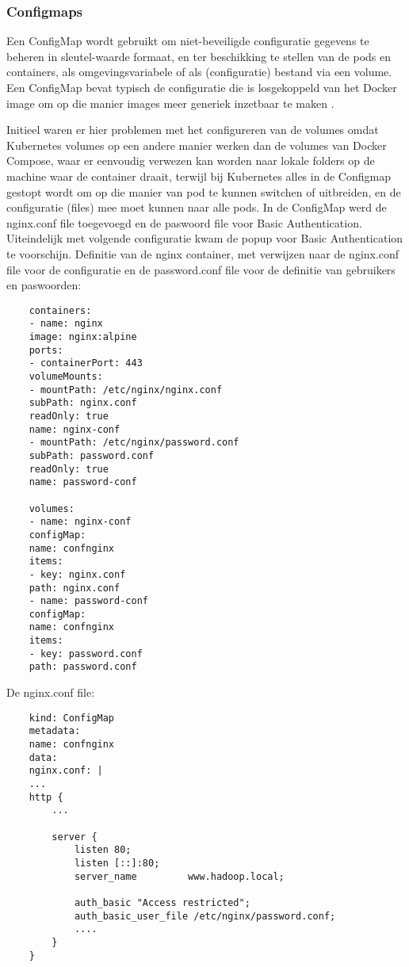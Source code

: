 \subsubsection{Configmaps} 
\autocite{Kubernetes2023}
\newline
Een ConfigMap wordt gebruikt om niet-beveiligde configuratie gegevens te beheren in sleutel-waarde formaat, en ter beschikking te stellen van de pods en containers, als omgevingsvariabele of als (configuratie) bestand via een volume.
Een ConfigMap bevat typisch de configuratie die is losgekoppeld van het Docker image om op die manier images meer generiek inzetbaar te maken \textcite{Kubernetes2023}.


Initieel waren er hier problemen met het configureren van de volumes omdat Kubernetes volumes op een andere manier werken dan de volumes van Docker Compose, waar er eenvoudig verwezen kan worden naar lokale folders op de machine waar de container draait, terwijl bij Kubernetes alles in de Configmap gestopt wordt om op die manier van pod te kunnen switchen of uitbreiden, en de configuratie (files) mee moet kunnen naar alle pods.
\newline
\newline
In de ConfigMap werd de nginx.conf file toegevoegd en de paswoord file voor Basic Authentication.
Uiteindelijk met volgende configuratie kwam de popup voor Basic Authentication te voorschijn.
\newline
Definitie van de nginx container, met verwijzen naar de nginx.conf file voor de configuratie en de password.conf file voor de definitie van gebruikers en paswoorden:
\newline
\begin{lstlisting}
    containers:
    - name: nginx
    image: nginx:alpine
    ports:
    - containerPort: 443
    volumeMounts:
    - mountPath: /etc/nginx/nginx.conf
    subPath: nginx.conf
    readOnly: true
    name: nginx-conf
    - mountPath: /etc/nginx/password.conf
    subPath: password.conf
    readOnly: true
    name: password-conf
    
    volumes:
    - name: nginx-conf
    configMap:
    name: confnginx
    items:
    - key: nginx.conf
    path: nginx.conf
    - name: password-conf
    configMap:
    name: confnginx
    items:
    - key: password.conf
    path: password.conf
\end{lstlisting}

De nginx.conf file:
\begin{lstlisting}
    kind: ConfigMap
    metadata:
    name: confnginx
    data:
    nginx.conf: |
    ...
    http {
        ...
        
        server {
            listen 80;
            listen [::]:80;
            server_name         www.hadoop.local;
            
            auth_basic "Access restricted";
            auth_basic_user_file /etc/nginx/password.conf;
            ....
        }
    }
\end{lstlisting}

